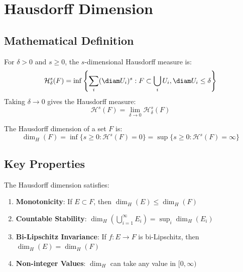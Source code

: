 \section{Hausdorff Dimension}

\subsection{Mathematical Definition}

\begin{definition}
For $\delta > 0$ and $s \geq 0$, the $s$-dimensional Hausdorff measure is:
\begin{equation}
    \mathcal{H}^s_\delta(F) = \inf \left\{ \sum_i (\diam U_i)^s : F \subset \bigcup_i U_i, \diam U_i \leq \delta \right\}
\end{equation}
Taking $\delta \to 0$ gives the Hausdorff measure:
\begin{equation}
    \mathcal{H}^s(F) = \lim_{\delta \to 0} \mathcal{H}^s_\delta(F)
\end{equation}
\end{definition}

\begin{definition}
The Hausdorff dimension of a set $F$ is:
\begin{equation}
    \dim_H(F) = \inf \{s \geq 0 : \mathcal{H}^s(F) = 0\} = \sup \{s \geq 0 : \mathcal{H}^s(F) = \infty\}
\end{equation}
\end{definition}

\subsection{Key Properties}

\begin{theorem}
The Hausdorff dimension satisfies:
\begin{enumerate}
    \item \textbf{Monotonicity}: If $E \subset F$, then $\dim_H(E) \leq \dim_H(F)$
    \item \textbf{Countable Stability}: $\dim_H(\bigcup_{i=1}^\infty E_i) = \sup_i \dim_H(E_i)$
    \item \textbf{Bi-Lipschitz Invariance}: If $f: E \to F$ is bi-Lipschitz, then $\dim_H(E) = \dim_H(F)$
    \item \textbf{Non-integer Values}: $\dim_H$ can take any value in $[0, \infty)$
\end{enumerate}
\end{theorem}

